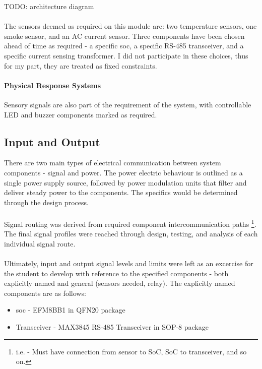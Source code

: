 \documentclass[12pt]{article}
\begin{document}
    TODO: architecture diagram

    \paragraph{}
    The sensors deemed as required on this module are: two temperature sensors, one smoke sensor, and an AC current sensor. Three components have been chosen ahead of time as required - a specific \acrfull{soc}, a specific RS-485 transceiver, and a specific current sensing transformer. I did not participate in these choices, thus for my part, they are treated as fixed constraints.

    \paragraph{Physical Response Systems}
    Sensory signals are also part of the requirement of the system, with controllable LED and buzzer components marked as required.

  \subsection{Input and Output} 
  There are two main types of electrical communication between system components - signal and power. The power electric behaviour is outlined as a single power supply source, followed by power modulation units that filter and deliver steady power to the components. The specifics would be determined through the design process.

  \paragraph{}
  Signal routing was derived from required component intercommunication paths \footnote{i.e. - Must have connection from sensor to SoC, SoC to transceiver, and so on.}. The final signal profiles were reached through design, testing, and analysis of each individual signal route.

  \paragraph{}
  Ultimately, input and output signal levels and limits were left as an excercise for the student to develop with reference to the specified components - both explicitly named and general (sensors needed, relay). The explicitly named components are as follows:

  \begin{itemize}
  \item \acrlong{soc} - EFM8BB1 in QFN20 package
  \item Transceiver - MAX3845 RS-485 Transceiver in SOP-8 package
  \end{itemize}
  
\end{document}
